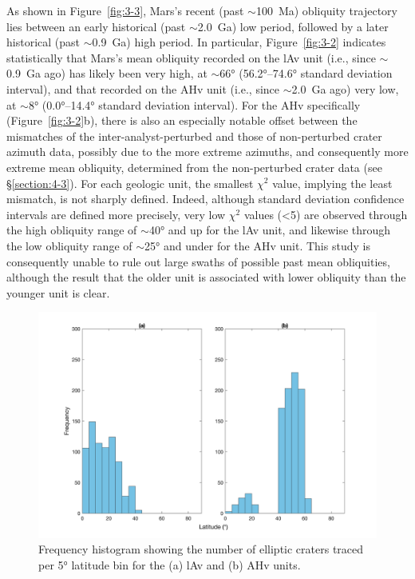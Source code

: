 \documentclass{ucetd}
\begin{document}
As shown in Figure~\ref{fig:3-3}, Mars’s recent (past $\sim$100~Ma) obliquity trajectory lies between an early historical (past $\sim$2.0~Ga) low period, followed by a later historical (past $\sim$0.9~Ga) high period. In particular, Figure~\ref{fig:3-2} indicates statistically that Mars’s mean obliquity recorded on the lAv unit (i.e., since $\sim$0.9~Ga ago) has likely been very high, at $\sim$66° (56.2°--74.6° standard deviation interval), and that recorded on the AHv unit (i.e., since $\sim$2.0~Ga ago) very low, at $\sim$8° (0.0°--14.4° standard deviation interval). For the AHv specifically (Figure~\ref{fig:3-2}b), there is also an especially notable offset between the mismatches of the inter-analyst-perturbed and those of non-perturbed crater azimuth data, possibly due to the more extreme azimuths, and consequently more extreme mean obliquity, determined from the non-perturbed crater data (see §\ref{section:4-3}). For each geologic unit, the smallest $\chi^2$ value, implying the least mismatch, is not sharply defined. Indeed, although standard deviation confidence intervals are defined more precisely, very low $\chi^2$ values (<5) are observed through the high obliquity range of $\sim$40° and up for the lAv unit, and likewise through the low obliquity range of $\sim$25° and under for the AHv unit. This study is consequently unable to rule out large swaths of possible past mean obliquities, although the result that the older unit is associated with lower obliquity than the younger unit is clear. 

\begin{figure}
    \includegraphics[width=\textwidth]{figures/fig4_1.png}
    \caption[Latitude frequency histogram of traced craters]{Frequency histogram showing the number of elliptic craters traced per 5° latitude bin for the (a) lAv and (b) AHv units.}
    \label{fig:4-1}
\end{figure}
\end{document}
